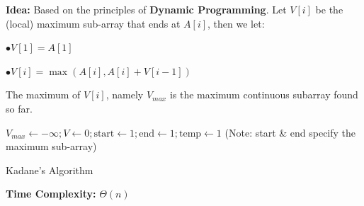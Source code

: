 \documentclass[10pt]{article}
\begin{document}
\textbf{Idea:} Based on the principles of \textbf{Dynamic Programming}. Let $V[i]$ be the (local) maximum sub-array that ends at $A[i]$, then we let:

$\bullet V[1] = A[1]$

$\bullet V[i] = \max(A[i], A[i] + V[i-1])$

The maximum of $V[i]$, namely $V_{max}$ is the maximum continuous subarray found so far.

\begin{algorithm}
	\SetAlgoLined
	
	$V_{max} \gets -\infty; V \gets 0; \text{start} \gets 1; \text{end} \gets 1; \text{temp} \gets 1$ (Note: start \& end specify the maximum sub-array)
		
	
	\caption{Kadane's Algorithm}
\end{algorithm}

\textbf{Time Complexity:} $\Theta(n)$
\end{document}
